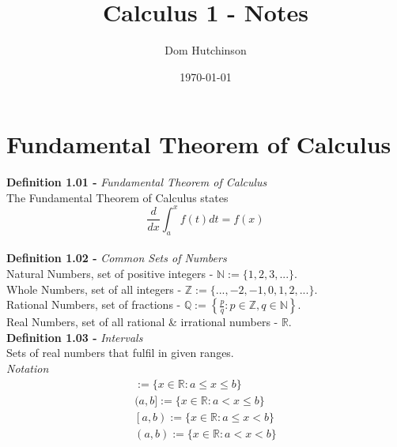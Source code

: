 \documentclass[11pt,a4paper]{article}
\begin{document}
\pagestyle{fancy}

\renewcommand{\headrulewidth}{0pt}
\setlength\parindent{0pt}

\title{Calculus 1 - Notes}
\author{Dom Hutchinson}
\date{\today}
\maketitle

\fancyhead[R]{\today}

\tableofcontents

\newpage

\section{Fundamental Theorem of Calculus}

\textbf{Definition 1.01 - }\textit{Fundamental Theorem of Calculus} \\
The Fundamental Theorem of Calculus states $$\frac{d}{dx}\int_{a}^{x} f(t) dt = f(x) $$ \\

\textbf{Definition 1.02 - }\textit{Common Sets of Numbers} \\
Natural Numbers, set of positive integers - $\mathbb{N} := \{1, 2, 3, ...\}$. \\
Whole Numbers, set of all integers - $\mathbb{Z} := \{..., -2, -1, 0, 1, 2, ...\}$. \\
Rational Numbers, set of fractions - $\mathbb{Q} := \left\{\frac{p}{q} : p \in \mathbb{Z}, q \in \mathbb{N} \right\}$. \\
Real Numbers, set of all rational \& irrational numbers - $\mathbb{R}$. \\

\textbf{Definition 1.03 - }\textit{Intervals} \\
Sets of real numbers that fulfil in given ranges. \\
\textit{Notation}
\begin{eqnarray*}
  [a,b] := \{x \in \mathbb{R} : a \leq x \leq b\} \\
  (a,b] := \{x \in \mathbb{R} : a < x \leq b\} \\
  \left[a,b\right) := \{x \in \mathbb{R} : a \leq x < b\} \\
  (a,b) := \{x \in \mathbb{R} : a < x < b \}
\end{eqnarray*}
\end{document}

